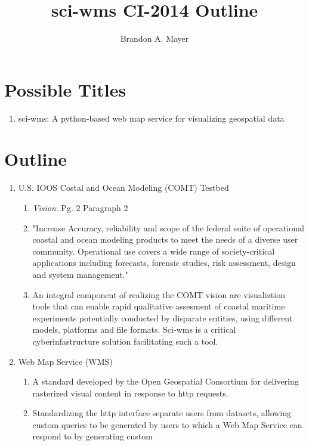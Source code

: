 \documentclass{article}
\author{Brandon A. Mayer}
\title{sci-wms CI-2014 Outline}
\date{}
\begin{document}
\maketitle
\section{Possible Titles}
\begin{enumerate}
  \item sci-wms: A python-based web map service for visualizing geospatial data
\end{enumerate}

\section{Outline}
\begin{enumerate}
  \item U.S. IOOS Costal and Ocean Modeling (COMT) Testbed~\cite{luettich13}
    \begin{enumerate}[label*=\arabic*.]\
      \item {\em Vision}: Pg. 2 Paragraph 2
      \item "Increase Accuracy, reliability and scope of the federal
        suite of operational coastal and ocean modeling products to
        meet the needs of a diverse user community. Operational use
        covers a wide range of society-critical applications including
        forecasts, forensic studies, risk assessment, design and system
        management."
      \item An integral component of realizing the COMT vision are
        visualiztion tools that can enable rapid qualitative assesment
        of coastal maritime experiments potentially conducted by
        disparate entities, using different models, platforms and file
        formats. Sci-wms is a critical cyberinfastructure solution facilitating such a tool.
    \end{enumerate}
  \item Web Map Service (WMS)~\cite{wms14}
    \begin{enumerate}[label*=\arabic*.]
      \item A standard developed by the Open Geospatial Consortium for
        delivering rasterized visual content in response to http
        requests.
      \item Standardizing the http interface separate users from
        datasets, allowing custom queries to be generated by users to
        which a Web Map Service can respond to by generating custom

\end{enumerate}
\end{enumerate}
\end{document}
